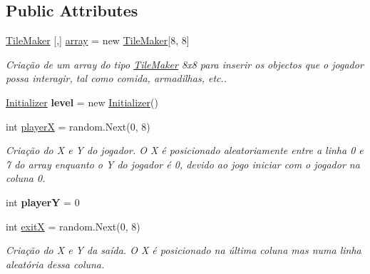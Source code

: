 \subsection*{Public Attributes}
\begin{DoxyCompactItemize}
\item 
\mbox{\hyperlink{class_projeto2___l_p1_1_1_tile_maker}{Tile\+Maker}} \mbox{[},\mbox{]} \mbox{\hyperlink{class_projeto2___l_p1_1_1_grid_a517769f1ab5634bb5cb20a3afde72083}{array}} = new \mbox{\hyperlink{class_projeto2___l_p1_1_1_tile_maker}{Tile\+Maker}}\mbox{[}8, 8\mbox{]}
\begin{DoxyCompactList}\small\item\em Criação de um array do tipo \mbox{\hyperlink{class_projeto2___l_p1_1_1_tile_maker}{Tile\+Maker}} 8x8 para inserir os objectos que o jogador possa interagir, tal como comida, armadilhas, etc.. \end{DoxyCompactList}\item 
\mbox{\label{class_projeto2___l_p1_1_1_grid_add1a97d645ca47b1fd91602b91a4a543}} 
\mbox{\hyperlink{class_projeto2___l_p1_1_1_initializer}{Initializer}} {\bfseries level} = new \mbox{\hyperlink{class_projeto2___l_p1_1_1_initializer}{Initializer}}()
\item 
int \mbox{\hyperlink{class_projeto2___l_p1_1_1_grid_aa0bc3b49820e0d8282128d8fb269437e}{playerX}} = random.\+Next(0, 8)
\begin{DoxyCompactList}\small\item\em Criação do X e Y do jogador. O X é posicionado aleatoriamente entre a linha 0 e 7 do array enquanto o Y do jogador é 0, devido ao jogo iniciar com o jogador na coluna 0. \end{DoxyCompactList}\item 
\mbox{\label{class_projeto2___l_p1_1_1_grid_a310066b76b6d011e54298605a3114dd1}} 
int {\bfseries playerY} = 0
\item 
int \mbox{\hyperlink{class_projeto2___l_p1_1_1_grid_a1fbb4462007865226251bc5c084e616e}{exitX}} = random.\+Next(0, 8)
\begin{DoxyCompactList}\small\item\em Criação do X e Y da saída. O X é posicionado na última coluna mas numa linha aleatória dessa coluna. \end{DoxyCompactList}\item 
\mbox{\label{class_projeto2___l_p1_1_1_grid_ac7c931fa4e5705e23741f64597124c3a}} 

\end{DoxyCompactItemize}
